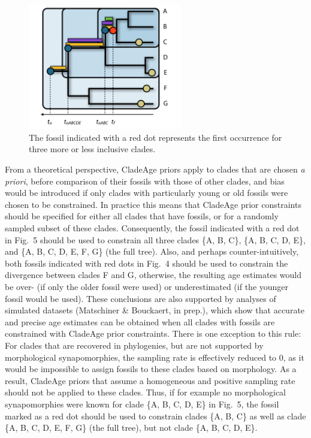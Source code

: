 \documentclass{article}
\begin{document}
\begin{figure}[h!]
\centering
\includegraphics[width=0.6\textwidth]{tree3}
\caption{The fossil indicated with a red dot represents the first occurrence for three more or less inclusive clades.}
\end{figure}

From a theoretical perspective, CladeAge priors apply to clades that are chosen \emph{a priori}, before comparison of their fossils with those of other clades, and bias would be introduced if only clades with particularly young or old fossils were chosen to be constrained. In practice this means that CladeAge prior constraints should be specified for either all clades that have fossils, or for a randomly sampled subset of these clades. Consequently, the fossil indicated with a red dot in Fig.\ 5 should be used to constrain all three clades \{A, B, C\}, \{A, B, C, D, E\}, and \{A, B, C, D, E, F, G\} (the full tree). Also, and perhaps counter-intuitively, both fossils indicated with red dots in Fig.\ 4 should be used to constrain the divergence between clades F and G, otherwise, the resulting age estimates would be over- (if only the older fossil were used) or underestimated (if the younger fossil would be used). These conclusions are also supported by analyses of simulated datasets (Matschiner \& Bouckaert, in prep.), which show that accurate and precise age estimates can be obtained when all clades with fossils are constrained with CladeAge prior constraints. There is one exception to this rule: For clades that are recovered in phylogenies, but are not supported by morphological synapomorphies, the sampling rate is effectively reduced to 0, as it would be impossible to assign fossils to these clades based on morphology. As a result, CladeAge priors that assume a homogeneous and positive sampling rate should not be applied to these clades. Thus, if for example no morphological synapomorphies were known for clade \{A, B, C, D, E\} in Fig.\ 5, the fossil marked as a red dot should be used to constrain clades \{A, B, C\} as well as clade \{A, B, C, D, E, F, G\} (the full tree), but not clade \{A, B, C, D, E\}.
\end{document}

